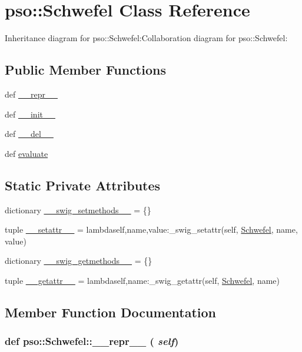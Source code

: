 \hypertarget{classpso_1_1Schwefel}{
\section{pso::Schwefel Class Reference}
\label{classpso_1_1Schwefel}
}
Inheritance diagram for pso::Schwefel:Collaboration diagram for pso::Schwefel:\subsection*{Public Member Functions}
\begin{CompactItemize}
\item 
def \hyperlink{classpso_1_1Schwefel_355d3604b3f13580871f2eeb90d42ef4}{\_\-\_\-repr\_\-\_\-}
\item 
def \hyperlink{classpso_1_1Schwefel_923da07160f0471b0797a092dc53f05f}{\_\-\_\-init\_\-\_\-}
\item 
def \hyperlink{classpso_1_1Schwefel_934aebcd5b45f4fda0b97076b4db949c}{\_\-\_\-del\_\-\_\-}
\item 
def \hyperlink{classpso_1_1Schwefel_ffe14ee462d46bf76e19065c755bb013}{evaluate}
\end{CompactItemize}
\subsection*{Static Private Attributes}
\begin{CompactItemize}
\item 
dictionary \hyperlink{classpso_1_1Schwefel_c3b3a6c2afe3fd3d83656d02402cad2e}{\_\-\_\-swig\_\-setmethods\_\-\_\-} = \{\}
\item 
tuple \hyperlink{classpso_1_1Schwefel_cf6df02d5b7d6b9dc27ea126a521c53d}{\_\-\_\-setattr\_\-\_\-} = lambdaself,name,value:\_\-swig\_\-setattr(self, \hyperlink{classpso_1_1Schwefel}{Schwefel}, name, value)
\item 
dictionary \hyperlink{classpso_1_1Schwefel_069965b80402f68af7a664aea8aea22f}{\_\-\_\-swig\_\-getmethods\_\-\_\-} = \{\}
\item 
tuple \hyperlink{classpso_1_1Schwefel_cd291b909d2a8bef16ce5b17d93c64ec}{\_\-\_\-getattr\_\-\_\-} = lambdaself,name:\_\-swig\_\-getattr(self, \hyperlink{classpso_1_1Schwefel}{Schwefel}, name)
\end{CompactItemize}


\subsection{Member Function Documentation}
\hypertarget{classpso_1_1Schwefel_355d3604b3f13580871f2eeb90d42ef4}{
\subsubsection{\setlength{\rightskip}{0pt plus 5cm}def pso::Schwefel::\_\-\_\-repr\_\-\_\- ( {\em self})}}
\label{classpso_1_1Schwefel_355d3604b3f13580871f2eeb90d42ef4}





